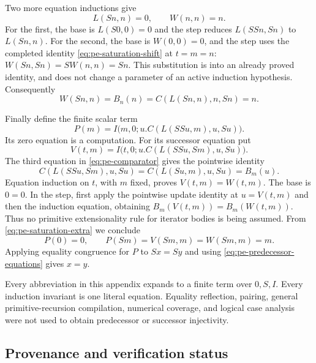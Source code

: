 Two more equation inductions give
\begin{equation}
 L(Sn,n)=0,\qquad W(n,n)=n.
 \label{eq:pe-saturation-diagonals}
\end{equation}
For the first, the base is $L(S0,0)=0$ and the step reduces
$L(SSn,Sn)$ to $L(Sn,n)$.  For the second, the base is $W(0,0)=0$,
and the step uses the completed identity
\eqref{eq:pe-saturation-shift} at $t=m=n$:
$W(Sn,Sn)=S W(n,n)=Sn$.  This substitution is into an already proved
identity, and does not change a parameter of an active induction
hypothesis.  Consequently
\begin{equation}
 W(Sn,n)=B_n(n)=C(L(Sn,n),n,Sn)=n.
 \label{eq:pe-saturation-extra}
\end{equation}

Finally define the finite scalar term
\begin{equation}
 P(m)=I\bigl(m,0;u.C(L(SSu,m),u,Su)\bigr).
 \label{eq:pe-predecessor-term}
\end{equation}
Its zero equation is a computation.  For its successor equation put
\[
 V(t,m)=I\bigl(t,0;u.C(L(SSu,Sm),u,Su)\bigr).
\]
The third equation in \eqref{eq:pe-comparator} gives the pointwise
identity
\[
 C(L(SSu,Sm),u,Su)=C(L(Su,m),u,Su)=B_m(u).
\]
Equation induction on $t$, with $m$ fixed, proves $V(t,m)=W(t,m)$.
The base is $0=0$.  In the step, first apply the pointwise update
identity at $u=V(t,m)$ and then the induction equation, obtaining
$B_m(V(t,m))=B_m(W(t,m))$.  Thus no primitive extensionality rule for
iterator bodies is being assumed.  From
\eqref{eq:pe-saturation-extra} we conclude
\begin{equation}
 \boxed{\quad P(0)=0,\qquad
 P(Sm)=V(Sm,m)=W(Sm,m)=m.\quad}
 \label{eq:pe-predecessor-equations}
\end{equation}
Applying equality congruence for $P$ to $Sx=Sy$ and using
\eqref{eq:pe-predecessor-equations} gives $x=y$.

Every abbreviation in this appendix expands to a finite term over
$0,S,I$.  Every induction invariant is one literal equation.  Equality
reflection, pairing, general primitive-recursion compilation, numerical
coverage, and logical case analysis were not used to obtain predecessor
or successor injectivity.

\subsection{Provenance and verification status}

